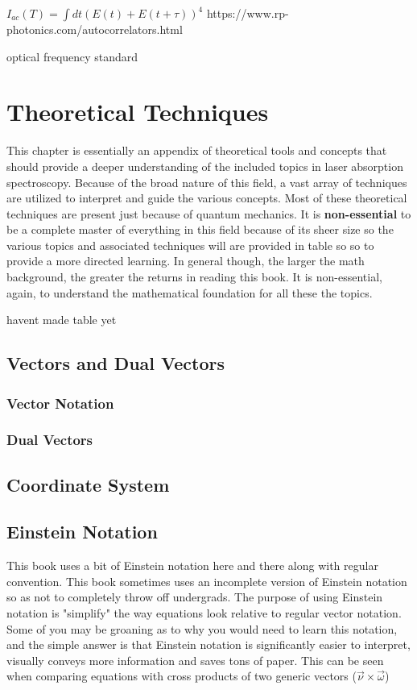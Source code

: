 \documentclass[11pt,a4paper]{book}
\begin{document}
$\displaystyle I_{ac}(T) = \int dt\left( E(t) + E(t + \tau ) \right)^4 $
https://www.rp-photonics.com/autocorrelators.html

optical frequency standard
\chapter{Theoretical Techniques}
	This chapter is essentially an appendix of theoretical tools and concepts that should provide a deeper understanding of the included topics in laser absorption spectroscopy. Because of the broad nature of this field, a vast array of techniques are utilized to interpret and guide the various concepts. Most of these theoretical techniques are present just because of quantum mechanics. It is \textbf{non-essential} to be a complete master of everything in this field because of its sheer size so the various topics and associated techniques will are provided in table so so to provide a more directed learning. In general though, the larger the math background, the greater the returns in reading this book. It is non-essential, again, to understand the mathematical foundation for all these the topics. 
	
	havent made table yet
	\section{Vectors and Dual Vectors}
		\label{sec:Vectors and Dual Vectors}
		\subsection{Vector Notation}
		\label{sec:Vector Notation}
		\subsection{Dual Vectors}
		\label{subsec:Dual Vectors}
	\section{Coordinate System}
		\label{coordinate System}
		
	\section{Einstein Notation}
		\label{sec:Einstein Notation}
		This book uses a bit of Einstein notation here and there along with regular convention. This book sometimes uses an incomplete version of Einstein notation so as not to completely throw off undergrads. The purpose of using Einstein notation is "simplify" the way equations look relative to regular vector notation. Some of you may be groaning as to why you would need to learn this notation, and the simple answer is that Einstein notation is significantly easier to interpret, visually conveys more information and saves tons of paper. This can be seen when comparing equations with cross products of two generic vectors ($\vec{\nu} \times \vec{\omega}$)
		
\end{document}
